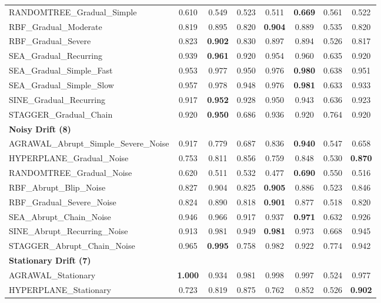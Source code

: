 \begin{table}[ht]
\begin{tabular}{l|ccccccc}
RANDOMTREE\_Gradual\_Simple & 0.610 & 0.549 & 0.523 & 0.511 & \textbf{0.669} & 0.561 & 0.522 \\
RBF\_Gradual\_Moderate & 0.819 & 0.895 & 0.820 & \textbf{0.904} & 0.889 & 0.535 & 0.820 \\
RBF\_Gradual\_Severe & 0.823 & \textbf{0.902} & 0.830 & 0.897 & 0.894 & 0.526 & 0.817 \\
SEA\_Gradual\_Recurring & 0.939 & \textbf{0.961} & 0.920 & 0.954 & 0.960 & 0.635 & 0.920 \\
SEA\_Gradual\_Simple\_Fast & 0.953 & 0.977 & 0.950 & 0.976 & \textbf{0.980} & 0.638 & 0.951 \\
SEA\_Gradual\_Simple\_Slow & 0.957 & 0.978 & 0.948 & 0.976 & \textbf{0.981} & 0.633 & 0.933 \\
SINE\_Gradual\_Recurring & 0.917 & \textbf{0.952} & 0.928 & 0.950 & 0.943 & 0.636 & 0.923 \\
STAGGER\_Gradual\_Chain & 0.920 & \textbf{0.950} & 0.686 & 0.936 & 0.920 & 0.764 & 0.920 \\
\multicolumn{8}{l}{\textbf{Noisy Drift (8)}} \\
AGRAWAL\_Abrupt\_Simple\_Severe\_Noise & 0.917 & 0.779 & 0.687 & 0.836 & \textbf{0.940} & 0.547 & 0.658 \\
HYPERPLANE\_Gradual\_Noise & 0.753 & 0.811 & 0.856 & 0.759 & 0.848 & 0.530 & \textbf{0.870} \\
RANDOMTREE\_Gradual\_Noise & 0.620 & 0.511 & 0.532 & 0.477 & \textbf{0.690} & 0.550 & 0.516 \\
RBF\_Abrupt\_Blip\_Noise & 0.827 & 0.904 & 0.825 & \textbf{0.905} & 0.886 & 0.523 & 0.846 \\
RBF\_Gradual\_Severe\_Noise & 0.824 & 0.890 & 0.818 & \textbf{0.901} & 0.877 & 0.518 & 0.820 \\
SEA\_Abrupt\_Chain\_Noise & 0.946 & 0.966 & 0.917 & 0.937 & \textbf{0.971} & 0.632 & 0.926 \\
SINE\_Abrupt\_Recurring\_Noise & 0.913 & 0.981 & 0.949 & \textbf{0.981} & 0.973 & 0.668 & 0.945 \\
STAGGER\_Abrupt\_Chain\_Noise & 0.965 & \textbf{0.995} & 0.758 & 0.982 & 0.922 & 0.774 & 0.942 \\
\multicolumn{8}{l}{\textbf{Stationary Drift (7)}} \\
AGRAWAL\_Stationary & \textbf{1.000} & 0.934 & 0.981 & 0.998 & 0.997 & 0.524 & 0.977 \\
HYPERPLANE\_Stationary & 0.723 & 0.819 & 0.875 & 0.762 & 0.852 & 0.526 & \textbf{0.902} \\

\end{tabular}
\end{table}
